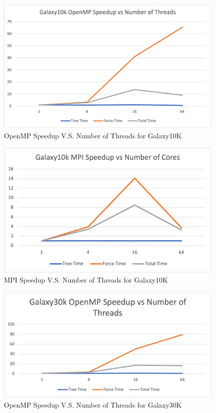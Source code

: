 \documentclass{article}
\begin{document}
\begin{figure}[h!]
  \includegraphics[width=\textwidth]{img/10k_openmp.png}
  \caption{OpenMP Speedup V.S. Number of Threads for Galaxy10K}
  \label{10k_openmp}
\end{figure}
\begin{figure}[h!]
  \includegraphics[width=\textwidth]{img/10k_mpi.png}
  \caption{MPI Speedup V.S. Number of Threads for Galaxy10K}
  \label{10k_mpi}
\end{figure}
\begin{figure}[h!]
  \includegraphics[width=\textwidth]{img/30k_openmp.png}
  \caption{OpenMP Speedup V.S. Number of Threads for Galaxy30K}
  \label{30k_openmp}
\end{figure}
\end{document}
